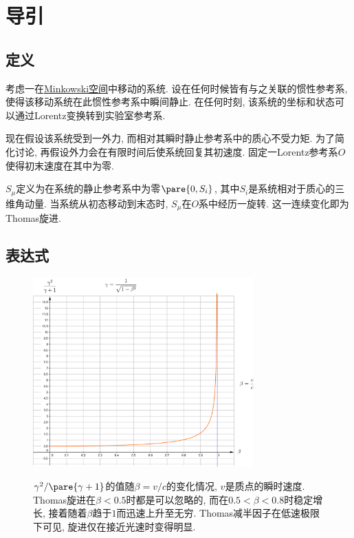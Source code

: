 \documentclass[hidelinks]{ctexart}
\begin{document}

\section{导引} %
\label{sec:导引}

\subsection{定义} %
\label{sub:定义}

考虑一在\href{https://en.wikipedia.org/wiki/Minkowski_spacetime}{Minkowski空间}中移动的系统. 设在任何时候皆有与之关联的惯性参考系, 使得该移动系统在此惯性参考系中瞬间静止. 在任何时刻, 该系统的坐标和状态可以通过Lorentz变换转到实验室参考系.
\par
现在假设该系统受到一外力, 而相对其瞬时静止参考系中的质心不受力矩. 为了简化讨论, 再假设外力会在有限时间后使系统回复其初速度. 固定一Lorentz参考系$O$使得初末速度在其中为零.
\par
{}$S_\mu$定义为在系统的静止参考系中为零$\pare{0,S_i}$, 其中$S_i$是系统相对于质心的三维角动量. 当系统从初态移动到末态时, $S_\mu$在$O$系中经历一旋转. 这一连续变化即为Thomas旋进.


\subsection{表达式} %
\label{sub:表达式}

\begin{figure}
    \begin{tcolorbox}[sharp corners=all,boxrule=.3pt,colframe=lightgray,left=1mm, top=1mm, right=1mm, bottom=1mm]
        \centerline{\includegraphics[width=8.5cm]{src/ThomasPrecession.png}}
        \scriptsize{}$\gamma^2/\pare{\gamma+1}$的值随$\beta = v/c$的变化情况, $v$是质点的瞬时速度. Thomas旋进在$\beta<0.5$时都是可以忽略的, 而在$0.5<\beta<0.8$时稳定增长, 接着随着$\beta$趋于$1$而迅速上升至无穷. Thomas减半因子在低速极限下可见, 旋进仅在接近光速时变得明显.
    \end{tcolorbox}
\end{figure}
\end{document}
